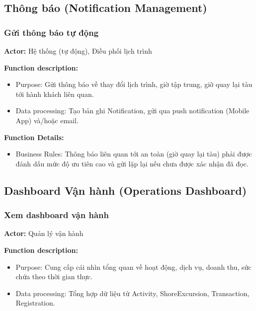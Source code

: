 
\subsection{Thông báo (Notification Management)}

\subsubsection{Gửi thông báo tự động}

\noindent\textbf{Actor:} Hệ thống (tự động), Điều phối lịch trình

\noindent\textbf{Function description:}
\begin{itemize}
    \item Purpose: Gửi thông báo về thay đổi lịch trình, giờ tập trung, giờ quay lại tàu tới hành khách liên quan.
    \item Data processing: Tạo bản ghi Notification, gửi qua push notification (Mobile App) và/hoặc email.
\end{itemize}

\noindent\textbf{Function Details:}
\begin{itemize}
    \item Business Rules: Thông báo liên quan tới an toàn (giờ quay lại tàu) phải được đánh dấu mức độ ưu tiên cao và gửi lặp lại nếu chưa được xác nhận đã đọc.
\end{itemize}


\subsection{Dashboard Vận hành (Operations Dashboard)}

\subsubsection{Xem dashboard vận hành}

\noindent\textbf{Actor:} Quản lý vận hành

\noindent\textbf{Function description:}
\begin{itemize}
    \item Purpose: Cung cấp cái nhìn tổng quan về hoạt động, dịch vụ, doanh thu, sức chứa theo thời gian thực.
    \item Data processing: Tổng hợp dữ liệu từ Activity, ShoreExcursion, Transaction, Registration.
\end{itemize}

